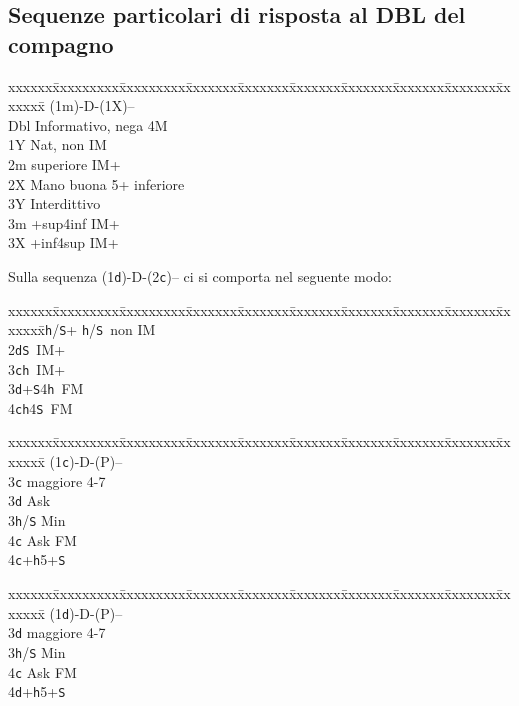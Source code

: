 \documentclass[a4paper,italian]{article}
\newcommand{\BS}{\small{\texttt{S}}}
\newcommand{\BC}{\small{\texttt{c}}}
\newcommand{\BD}{\small{\texttt{d}}}
\newcommand{\BH}{\small{\texttt{h}}}
\newenvironment{bidtable}
{\begin{tabbing}

    xxxxxx\=xxxxxxxxx\=xxxxxxxxx\=xxxxxxx\=xxxxxxx\=xxxxxxx\=xxxxxxx\=xxxxxxx\=xxxxxxx\=xxxxxxx\=\kill}
{\end{tabbing} }%
\newenvironment{sviluppi}
{\begin{tcolorbox}[colframe=azzurro,title=Sviluppi particolari]}
    {
\end{tcolorbox} }%
\begin{document}
\begin{multicols}{2}
    \subsection{Sequenze particolari di risposta al DBL del compagno}

    \begin{bidtable}
        (1m)-D-(1X)--\+\\
        Dbl \> Informativo, nega 4M\\
        1Y \> Nat, non IM\\
        2m  superiore IM+\\
        2X \> Mano buona 5+ inferiore\\
        3Y \> Interdittivo\\
        3m +sup4inf IM+\\
        3X +inf4sup IM+
    \end{bidtable}

    \begin{sviluppi}
        Sulla sequenza (1\BD)-D-(2\BC)-- ci si comporta nel seguente modo:
        \begin{bidtable}
            2\BH/\BS{}+ \BH/\BS\ non IM\\
            2\BD{}\BS\ IM+\\
            3\BC{}\BH\ IM+\\
            3\BD{}+\BS4\BH\ FM\\
            4\BC{}\BH4\BS\ FM
        \end{bidtable}

    \end{sviluppi}

    \begin{bidtable}
        (1\BC)-D-(P)--\+\\
        3\BC {} maggiore 4-7\+\\
        3\BD \> Ask\\
        3\BH/\BS \> Min\+\\
        4\BC \> Ask FM\-\\
        4\BC {}+\BH 5+\BS
    \end{bidtable}

    \begin{bidtable}
        (1\BD)-D-(P)--\+\\
        3\BD {} maggiore 4-7\+\\
        3\BH/\BS \> Min\\
        4\BC \> Ask FM\-\\
        4\BD {}+\BH 5+\BS \-
    \end{bidtable}


\end{multicols}
\end{document}
